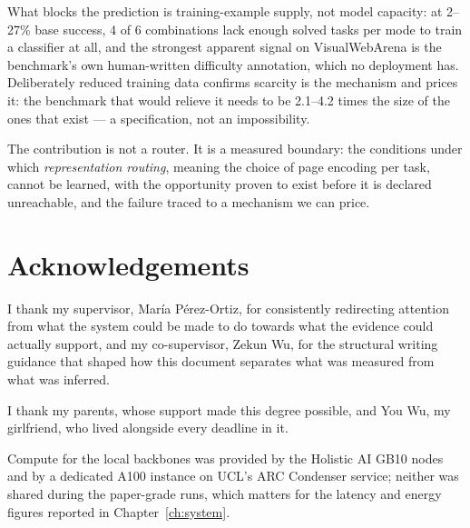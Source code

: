 {What blocks the prediction is training-example supply, not model capacity: at
2--27\% base success, 4 of 6 combinations lack enough solved tasks per mode to
train a classifier at all, and the strongest apparent signal on
VisualWebArena is the benchmark's own human-written difficulty annotation,
which no deployment has. Deliberately reduced training data confirms scarcity
is the mechanism and prices it: the benchmark that would relieve it needs to
be 2.1--4.2 times the size of the ones that exist --- a specification, not an
impossibility.

The contribution is not a router. It is a measured boundary: the conditions
under which \emph{representation routing}, meaning the choice of page encoding
per task, cannot be learned, with the
opportunity proven to exist before it is declared unreachable, and the failure
traced to a mechanism we can price.

    \thispagestyle{abstract}
}
\newpage

\clearpage
{
    \pagestyle{acknowledgements}
    \chapter*{Acknowledgements}

I thank my supervisor, Mar\'ia P\'erez-Ortiz, for consistently redirecting
attention from what the system could be made to do towards what the evidence
could actually support, and my co-supervisor, Zekun Wu, for the structural
writing guidance that shaped how this document separates what was measured from
what was inferred.

I thank my parents, whose support made this degree possible, and You Wu, my
girlfriend, who lived alongside every deadline in it.

Compute for the local backbones was provided by the Holistic AI GB10 nodes and
by a dedicated A100 instance on UCL's ARC Condenser service; neither was shared
during the paper-grade runs, which matters for the latency and energy figures
reported in Chapter~\ref{ch:system}.

    \thispagestyle{acknowledgements}
}
\newpage

